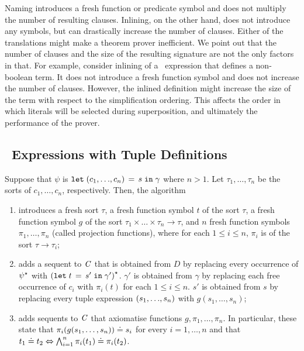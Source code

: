 Naming introduces a fresh function or predicate symbol and does not multiply the number of resulting clauses. Inlining, on the other hand, does not introduce any symbols, but can drastically increase the number of clauses. Either of the translations might make a theorem prover inefficient. We point out that the number of clauses and the size of the resulting signature are not the only factors in that. For example, consider inlining of a \LETIN\ expression that defines a non-boolean term. It does not introduce a fresh function symbol and does not increase the number of clauses. However, the inlined definition might increase the size of the term with respect to the simplification ordering. This affects the order in which literals will be selected during superposition, and ultimately the performance of the prover.


\subsection*{\LETIN\ Expressions with Tuple Definitions}
Suppose that $\psi$ is $\mathtt{let}\;{({c_1},{\ldots},{c_n})}\,=\,{s}\;\allowbreak\mathtt{in}\;{\gamma}$ where $n > 1$. Let $\tau_1,\ldots,\tau_n$ be the sorts of $c_1,\ldots,c_n$, respectively. Then, 
the \nfcnf{} algorithm 
\begin{enumerate}
  \item introduces a fresh sort $\tau$, a fresh function symbol $t$ of the sort $\tau$, a fresh function symbol $g$ of the sort $\tau_1\times\ldots\times\tau_n\to\tau$, and $n$ fresh function symbols $\pi_1,\ldots,\pi_n$ (called projection functions), where for each $1 \le i \le n$, $\pi_i$ is of the sort $\tau \to \tau_i$;
  \item adds a sequent to $\mathit{C}$ that is obtained from $D$ by replacing every occurrence of ${\psi}^{\star}$ with ${(\mathtt{let}\;{t}\,=\,{s'}\;\allowbreak\mathtt{in}\;{\gamma'})}^{\star}$. $\gamma'$ is obtained from $\gamma$ by replacing each free occurrence of $c_i$ with $\pi_i(t)$ for each $1 \le i \le n$. $s'$ is obtained from $s$ by replacing every tuple expression $({s_1},{\ldots},{s_n})$ with $g(s_1,\ldots,s_n)$;
  \item adds sequents to $\mathit{C}$ that axiomatise functions $g,\pi_1,\ldots,\pi_n$. In particular, these state
  that $\pi_i(g(s_1,\ldots,s_n)) \doteq s_i$ for every $i=1,\ldots, n$ and that $t_1 \doteq t_2 \Leftrightarrow \bigwedge_{i=1}^n \pi_i(t_1) \doteq \pi_i(t_2)$.
\end{enumerate} 

